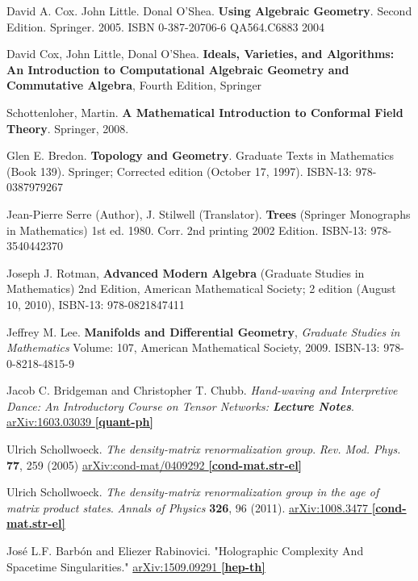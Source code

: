 \documentclass[10pt]{amsart}
\begin{document}
\begin{thebibliography}{9}

David A. Cox.  John Little. Donal O'Shea. \textbf{Using Algebraic Geometry}.  Second Edition.  Springer.  2005.  ISBN 0-387-20706-6 QA564.C6883 2004

David Cox, John Little, Donal O'Shea. \textbf{Ideals, Varieties, and Algorithms: An Introduction to Computational Algebraic Geometry and Commutative Algebra}, Fourth Edition, Springer

Schottenloher, Martin.  \textbf{A Mathematical Introduction to Conformal Field Theory}.  Springer, 2008.  




Glen E. Bredon.  \textbf{Topology and Geometry}. Graduate Texts in Mathematics (Book 139).  Springer; Corrected edition (October 17, 1997).  ISBN-13: 978-0387979267


Jean-Pierre Serre (Author), J. Stilwell (Translator).  \textbf{Trees} (Springer Monographs in Mathematics) 1st ed. 1980. Corr. 2nd printing 2002 Edition.  ISBN-13: 978-3540442370

Joseph J. Rotman, \textbf{Advanced Modern Algebra} (Graduate Studies in Mathematics) 2nd Edition, American Mathematical Society; 2 edition (August 10, 2010), ISBN-13: 978-0821847411

Jeffrey M. Lee. \textbf{Manifolds and Differential Geometry}, \emph{Graduate Studies in Mathematics} Volume: 107, American Mathematical Society, 2009. ISBN-13: 978-0-8218-4815-9

Jacob C. Bridgeman and Christopher T. Chubb.  \emph{Hand-waving and Interpretive Dance: An Introductory Course on Tensor Networks: \textbf{Lecture Notes}}.  \href{https://arxiv.org/abs/1603.03039}{arXiv:1603.03039 \textbf{[quant-ph]}}

Ulrich Schollwoeck.  \emph{The density-matrix renormalization group}.   \emph{Rev. Mod. Phys.} \textbf{77}, 259 (2005)	\href{https://arxiv.org/abs/cond-mat/0409292}{arXiv:cond-mat/0409292 \textbf{[cond-mat.str-el]}}

Ulrich Schollwoeck.  \emph{The density-matrix renormalization group in the age of matrix product states}.  \emph{Annals of Physics} \textbf{326}, 96 (2011).  \href{https://arxiv.org/abs/1008.3477}{arXiv:1008.3477 \textbf{[cond-mat.str-el]}}

Jos\'{e} L.F. Barb\'{o}n and Eliezer Rabinovici.  "Holographic Complexity And Spacetime Singularities."  \href{https://arxiv.org/abs/1509.09291v3}{arXiv:1509.09291 \textbf{[hep-th]}}


\end{thebibliography}
\end{document}
